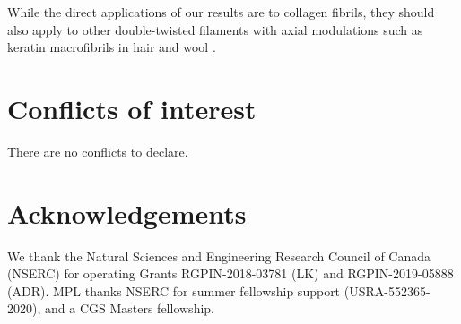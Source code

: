 \documentclass[preprint,12pt]{elsarticle}
\begin{document}
While the direct applications of our results are to collagen fibrils, they should also apply to other double-twisted filaments with axial modulations such as keratin macrofibrils in hair and wool \cite{Kreplak:2002, Harland:2014}. 

\section*{Conflicts of interest}
There are no conflicts to declare.
\section*{Acknowledgements}
We thank the Natural Sciences and Engineering Research Council of Canada (NSERC) for operating Grants RGPIN-2018-03781 (LK) and RGPIN-2019-05888 (ADR). MPL thanks NSERC for summer fellowship support (USRA-552365-2020), and a CGS Masters fellowship.

 

\end{document}
